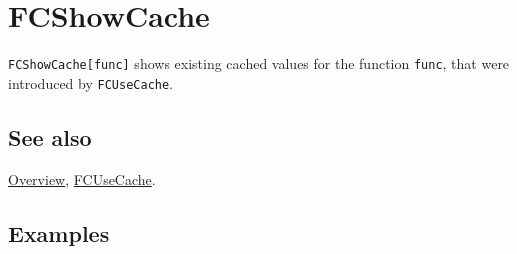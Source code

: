 \documentclass[../FeynCalcManual.tex]{subfiles}
\begin{document}
\hypertarget{fcshowcache}{
\section{FCShowCache}\label{fcshowcache}}

\texttt{FCShowCache[\allowbreak{}func]} shows existing cached values for
the function \texttt{func}, that were introduced by \texttt{FCUseCache}.

\subsection{See also}

\hyperlink{toc}{Overview}, \hyperlink{fcusecache}{FCUseCache}.

\subsection{Examples}
\end{document}
